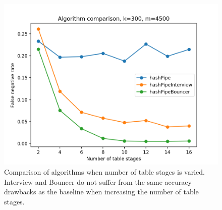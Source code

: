 \begin{figure}[!htb]
  \centering
    \includegraphics[scale=0.5]{stageComparison}
     \caption{Comparison of algorithms when number of table stages is varied. Interview and Bouncer do not suffer from the same accuracy drawbacks as the baseline when increasing the number of table stages.}
     \label{fig:stageComparison}
\end{figure}
